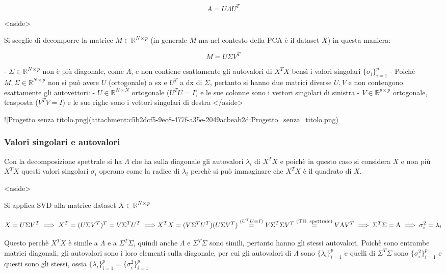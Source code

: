 $$
A=U\Lambda U^T
$$

<aside>


Si sceglie di decomporre la matrice $M\in\mathbb{R}^{N\times p}$ (in generale $M$ ma nel contesto della PCA è il dataset $X$) in questa maniera:

$$
M = U \Sigma V^T
$$

- $\Sigma\in\mathbb{R}^{N\times p}$ non è più diagonale, come $\Lambda$, e non contiene esattamente gli autovalori di $X^TX$ bensì i valori singolari $\{\sigma_i\}_{i=1}^p$
- Poichè $M,\Sigma\in\mathbb{R}^{N\times p}$ non si può avere $U$ (ortogonale) a sx e $U^T$ a dx di $\Sigma$, pertanto si hanno due matrici diverse $U,V$ e non contengono esattamente gli autovettori:
- $U\in\mathbb{R}^{N\times N}$ ortogonale ($U^TU=I$) e le sue colonne sono i vettori singolari di sinistra
- $V\in\mathbb{R}^{p\times p}$ ortogonale, trasposta ($V^TV=I$) e le sue righe sono i vettori singolari di destra
</aside>

![Progetto senza titolo.png](attachment:c5b2dcf5-9ec8-477f-a35e-2049acbeab2d:Progetto_senza_titolo.png)

\subsubsection{Valori singolari e autovalori}

Con la decomposizione spettrale si ha $\Lambda$ che ha sulla diagonale gli autovalori $\lambda_i$ di $X^TX$ e poichè in questo caso si considera $X$ e non più $X^TX$ questi valori singolari $\sigma_i$ operano come la radice di $\lambda_i$ perchè si può immaginare che $X^TX$ è il quadrato di $X$.

<aside>


Si applica SVD alla matrice dataset $X\in\mathbb{R}^{N\times p}$

$$
X = U \Sigma V^T\implies X^T=(U \Sigma V^T)^T=V\Sigma^TU^T\implies\\[.3cm]

X^TX=(V\Sigma^TU^T)(U \Sigma V^T)\overset{(U^TU=I)}{=}V\Sigma^T \Sigma V^T\overset{(\text{TH. spettrale})}{=}V\Lambda V^T\implies \Sigma^T\Sigma=\Lambda\implies\sigma_i^2=\lambda_i
$$

Questo perchè $X^TX$ è simile a $\Lambda$ e a $\Sigma^T\Sigma$, quindi anche $\Lambda$ e $\Sigma^T\Sigma$ sono simili, pertanto hanno gli stessi autovalori. Poichè sono entrambe matrici diagonali, gli autovalori sono i loro elementi sulla diagonale, per cui gli autovalori di $\Lambda$ sono $\{\lambda_i\}_{i=1}^p$ e quelli di $\Sigma^T\Sigma$ sono $\{\sigma_i^2\}_{i=1}^p$ e questi sono gli stessi, ossia $\{\lambda_i\}_{i=1}^p=\{\sigma_i^2\}_{i=1}^p$

